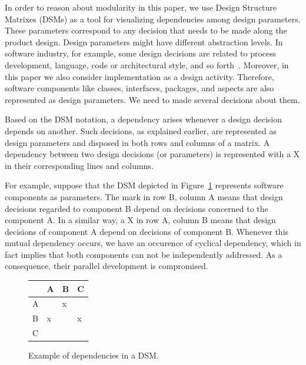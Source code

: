 In order to reason about modularity in this paper, we use Design Structure
Matrixes (DSMs) as a tool for visualizing dependencies among design parameters.
These parameters correspond to any decision that needs to be made along the
product design. Design parameters might have different abstraction levels. In
software industry, for example, some design decisions are related to process
development, language, code or architectural style, and so
forth~\cite{ribeiro-sbes-07}. Moreover, in this paper we also consider
implementation as a design activity. Therefore, software components like
classes, interfaces, packages, and aspects are also represented as design
parameters. We need to made several decisions about them. 

Based on the DSM notation, a dependency arises whenever a design
decision depends on another. Such decisions, as explained earlier, are
represented as design parameters and disposed in both rows and columns of a
matrix. A dependency between two design decisions (or parameters) is represented
with a X in their corresponding lines and columns.

For example, suppose that the DSM depicted in Figure~\ref{dsm:example} represents
software components as parameters. The mark in row B, column A means that design
decisions regarded to component B depend on decisions concerned to the component
A. In a similar way, a X in row A, column B means that design decisions of
component A depend on decisions of component B. Whenever this mutual dependency
occurs, we have an occurence of cyclical dependency, which in fact implies that
both components can not be independently addressed. As a consequence, their
parallel development is compromised.

\begin{figure}[h]
    \begin{center}
           \begin{scriptsize}
            \begin{tabular}{|l|l|l|l|} \hline
                        & A     & B    & C 	\\ \hline
                A      &        &  x    &   	\\ \hline
                B 	&  x    &       &  x 	\\ \hline
                C	&        &       &   	\\ \hline
            \end{tabular}
            \end{scriptsize}
            \label{dsm:example}
        \caption{Example of dependencies in a DSM.}
    \end{center}
\end{figure}

